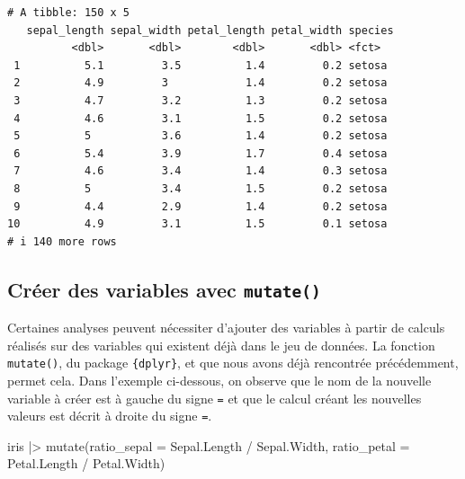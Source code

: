 \documentclass[
  letterpaper,
]{book}
\newenvironment{Shaded}{\begin{snugshade}}{\end{snugshade}}
\newcommand{\AttributeTok}[1]{\textcolor[rgb]{0.40,0.45,0.13}{#1}}
\newcommand{\FunctionTok}[1]{\textcolor[rgb]{0.28,0.35,0.67}{#1}}
\newcommand{\NormalTok}[1]{\textcolor[rgb]{0.00,0.23,0.31}{#1}}
\newcommand{\SpecialCharTok}[1]{\textcolor[rgb]{0.37,0.37,0.37}{#1}}
\begin{document}
\begin{verbatim}
# A tibble: 150 x 5
   sepal_length sepal_width petal_length petal_width species
          <dbl>       <dbl>        <dbl>       <dbl> <fct>  
 1          5.1         3.5          1.4         0.2 setosa 
 2          4.9         3            1.4         0.2 setosa 
 3          4.7         3.2          1.3         0.2 setosa 
 4          4.6         3.1          1.5         0.2 setosa 
 5          5           3.6          1.4         0.2 setosa 
 6          5.4         3.9          1.7         0.4 setosa 
 7          4.6         3.4          1.4         0.3 setosa 
 8          5           3.4          1.5         0.2 setosa 
 9          4.4         2.9          1.4         0.2 setosa 
10          4.9         3.1          1.5         0.1 setosa 
# i 140 more rows
\end{verbatim}

\subsection{\texorpdfstring{Créer des variables avec
\texttt{mutate()}}{Créer des variables avec mutate()}}\label{cruxe9er-des-variables-avec-mutate}

Certaines analyses peuvent nécessiter d'ajouter des variables à partir
de calculs réalisés sur des variables qui existent déjà dans le jeu de
données. La fonction \texttt{mutate()}, du package \texttt{\{dplyr\}},
et que nous avons déjà rencontrée précédemment, permet cela. Dans
l'exemple ci-dessous, on observe que le nom de la nouvelle variable à
créer est à gauche du signe \texttt{=} et que le calcul créant les
nouvelles valeurs est décrit à droite du signe \texttt{=}.

\begin{Shaded}
\begin{Highlighting}[]
\NormalTok{iris }\SpecialCharTok{|\textgreater{}}
  \FunctionTok{mutate}\NormalTok{(}\AttributeTok{ratio\_sepal =}\NormalTok{ Sepal.Length }\SpecialCharTok{/}\NormalTok{ Sepal.Width,}
         \AttributeTok{ratio\_petal =}\NormalTok{ Petal.Length }\SpecialCharTok{/}\NormalTok{ Petal.Width)}
\end{Highlighting}
\end{Shaded}
\end{document}
